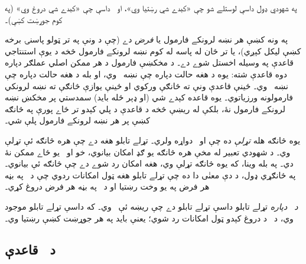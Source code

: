 \documentclass[12pt,a4paper,oneside]{report}
\newcommand{\olfileid}[3]{\gdef\pspart{#1}\gdef\pschapter{#2}\gdef\pssection{#3}}
\gdef\pspart{#2}\gdef\pschapter{#3}\gdef\pssection{}%
\theoremstyle{definition}
\begin{document}
\label{olpseg:OLP-0099-B008:start}
په شهودي ډول  داسې لوستلے شو چې «کېدے شي
 رښتيا وي»، او~ داسې چې «کېدے شي
 دروغ وي» (په کوم جوړښت کښې)۔
\label{olpseg:OLP-0099-B008:end}

\label{olpseg:OLP-0099-B009:start}
په ونه کښې هر نښه لرونکے فارمول يا \emph{فرض} دے (چې د ونې په
تر ټولو پاسنۍ برخه کښې ليکل کېږي)، يا تر ځان له پاسه له کوم
نښه لرونکے فارمول څخه د يوې استنتاجي قاعدې په وسيله اخستل شوے
دے۔ د مخکښې فارمول د هر ممکن اصلي عملګر دپاره دوه
قاعدې شته: يوه د هغه حالت دپاره چې نښه~\LR{$\True$} وي، او بله د هغه
حالت دپاره چې نښه~\LR{$\False$} وي۔ ځينې قاعدې ونې ته څانګې ورکوي او
ځينې يوازې څانګې ته نښه لرونکي فارمولونه ورزياتوي۔ يوه قاعده
کېدے شي (او ډېر ځله بايد) سمدستي پر مخکښ نښه لرونکے فارمول نۀ،
بلکې له ريښې څخه د قاعدې د پلي کېدو تر ځاے پورې په څانګه کښې پر هر
نښه لرونکے فارمول پلې شي۔
\label{olpseg:OLP-0099-B009:end}

\label{olpseg:OLP-0099-B010:start}
يوه څانګه هله \emph{تړلې} ده چې
 او~ دواړه ولري۔
تړلے تابلو هغه دے چې هره څانګه ئې تړلې وي۔ د شهودي تعبير له
مخې هره څانګه يو ګډ امکان بيانوي، خو
 او~ يو ځاے ممکن نۀ دي۔
په بله وينا، که يوه څانګه تړلې وي، هغه امکان رد شوے دے چې څانګه
ئې بيانوي۔ په ځانګړي ډول، د دې معنٰی دا ده چې تړلے تابلو هغه
ټول امکانات ردوي چې د~ په بڼه هر فرض په يو وخت
رښتيا او د~ په بڼه هر فرض دروغ کړي۔
\label{olpseg:OLP-0099-B010:end}

\label{olpseg:OLP-0099-B011:start}
\emph{د~ دپاره} تړلے تابلو داسې تړلے تابلو دے چې
ريښه ئې~ وي۔ که داسې تړلے تابلو موجود
وي، د~ د دروغ کېدو ټول امکانات رد شوي؛ يعنې  بايد په هر
جوړښت کښې رښتيا وي۔
\label{olpseg:OLP-0099-B011:end}

\label{olpseg:OLP-0100-B004:start}
\olfileid{fol}{tab}{prl}
\label{olpseg:OLP-0100-B004:end}

\label{olpseg:OLP-0100-B005:start}
\label{olpseg:OLP-0100-B005:end}

\label{olpseg:OLP-0100-B006:start}
\subsection{د~\LR{$\lnot$} قاعدې}
\label{olpseg:OLP-0100-B006:end}
\end{document}
